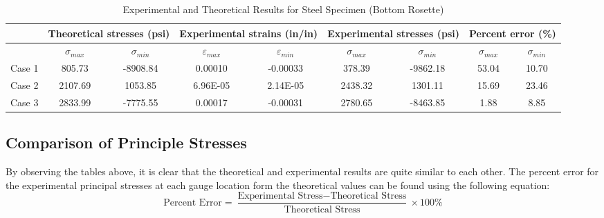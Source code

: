 \documentclass[12pt, titlepage]{article}
\begin{document}
\begin{table}[H]
  \begin{adjustwidth}{-1in}{-1in}
    \begin{tabular}{|c|c|c|c|c|c|c|c|c|} \hline
        & \multicolumn{2}{|c|}{\parbox{4cm}{\centering\textbf{Theoretical stresses (psi)}}} 
        & \multicolumn{2}{|c|}{\parbox{4cm}{\centering\textbf{Experimental strains (in/in)}}} 
        & \multicolumn{2}{|c|}{\parbox{4cm}{\centering\textbf{Experimental stresses (psi)}}} 
        & \multicolumn{2}{|c|}{\parbox{4cm}{\centering\textbf{Percent error (\%)}}} 
        \\ \hline
        & $\sigma_{max}$ & $\sigma_{min}$ & $\varepsilon_{max}$ & $\varepsilon_{min}$ & $\sigma_{max}$ & $\sigma_{min}$ & $\sigma_{max}$ & $\sigma_{min}$ \\ \hline
        Case 1 & 805.73 & -8908.84 & 0.00010 & -0.00033 & 378.39 & -9862.18 & 53.04 & 10.70 \\ \hline
        Case 2 & 2107.69 & 1053.85 & 6.96E-05 & 2.14E-05 & 2438.32 & 1301.11 & 15.69 & 23.46 \\ \hline
        Case 3 & 2833.99 & -7775.55 & 0.00017 & -0.00031 & 2780.65 & -8463.85 & 1.88 & 8.85 \\ \hline
    \end{tabular}
  \end{adjustwidth}
  \captionsetup{justification=raggedright,singlelinecheck=false}
  \caption{Experimental and Theoretical Results for Steel Specimen (Bottom Rosette)}
  \label{tab:table_steel_bot}
\end{table}
\newpage
\subsection{Comparison of Principle Stresses}
By observing the tables above, it is clear that the theoretical and
experimental results are quite similar to each other. The percent error for
the experimental principal stresses at each gauge location form the theoretical
values can be found using the following equation:
\begin{equation}
    \text{Percent Error} = \frac{\text{Experimental Stress} - \text{Theoretical Stress}}{\text{Theoretical Stress}} \times 100\%
    \label{eq:percent_error}
\end{equation}
\end{document}
